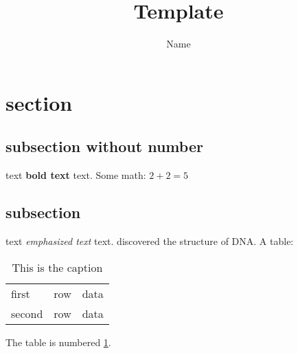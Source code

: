 \documentclass[11pt]{article}
\title{Template}
\author{Name}
\begin{document}
\maketitle
\section{section}
\subsection*{subsection without number}
text \textbf{bold text} text. Some math: $2+2=5$
\subsection{subsection}
text \emph{emphasized text} text.
discovered the structure of DNA.
A table:
\begin{table}[!th]
    \centering
    \begin{tabular}{|l|c|r|}
        \hline
        first  & row & data \\
        second & row & data \\
        \hline
    \end{tabular}
    \caption{This is the caption}
    \label{ex:table}
\end{table}
The table is numbered \ref{ex:table}.
\end{document}
